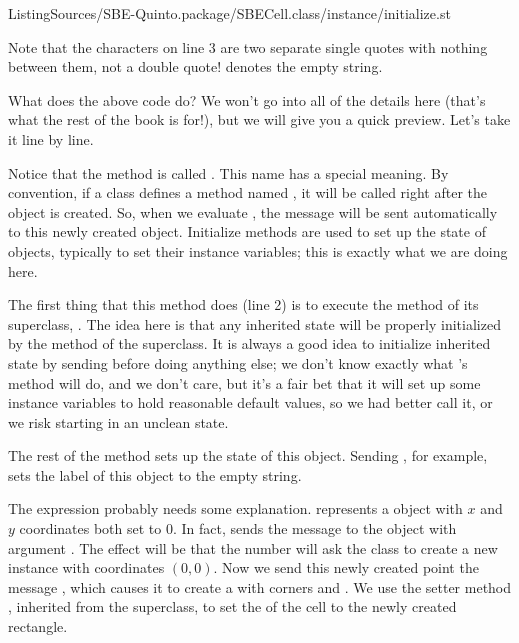 \documentclass[a4paper,10pt,twoside]{book}
\begin{document}
%
{ListingSources/SBE-Quinto.package/SBECell.class/instance/initialize.st}	

\noindent
Note that the characters  on line 3 are two separate single quotes with nothing between them, not a double quote!
 denotes the empty string.


What does the above code do?
We won't go into all of the details here (that's what the rest of the book is for!), but we will give you a quick preview.
Let's take it line by line.

Notice that the method is called .
This name has a special meaning.
By convention, if a class defines a method named , it will be called right after the object is created.
So, when we evaluate , the message  will be sent automatically to this newly created object.
Initialize methods are used to set up the state of objects, typically to set their instance variables; this is exactly what we are doing here.

The first thing that this method does (line 2) is to execute the  method of its superclass, .
The idea here is that any inherited state will be properly initialized by the  method of the superclass.
It is always a good idea to initialize inherited state by sending  before doing anything else; we don't know exactly what 's  method will do, and we don't care, but it's a fair bet that it will set up some instance variables to hold reasonable default values, so we had better call it, or we risk starting in an unclean state.

The rest of the method sets up the state of this object.
Sending , for example, sets the label of this object to the empty string.

The expression  probably needs some explanation. 
 represents a  object with $x$ and $y$ coordinates both set to 0.
In fact,  sends the message  to the  object  with argument .
The effect will be that the number  will ask the  class to create a new instance with coordinates $(0,0)$.
Now we send this newly created point the message , which causes it to create a  with corners  and .
We use the setter method , inherited from the superclass, to set the  of the cell to the newly created rectangle.
\end{document}
